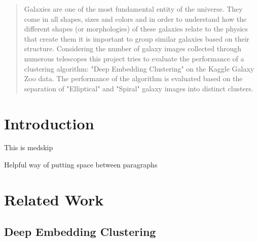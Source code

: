 \documentclass{article}
\begin{document}
\begin{abstract}
Galaxies are one of the most fundamental entity of the universe. They come in all shapes, sizes and colors and 
in order to understand how the different shapes (or morphologies) of these galaxies relate to the physics that 
create them it is important to group similar galaxies based on their structure. Considering the number of galaxy 
images collected through numerous telescopes this project tries to evaluate the performance of a clustering 
algorithm: "Deep Embedding Clustering" on the Kaggle Galaxy Zoo data. The performance of the algorithm 
is evaluated based on the separation of "Elliptical" and "Spiral" galaxy images into distinct clusters.
\end{abstract}







\section{Introduction}
\label{introduction}

This is medskip

\medskip


Helpful way of putting space between paragraphs






\section{Related Work}

\subsection{Deep Embedding Clustering}
\end{document}
